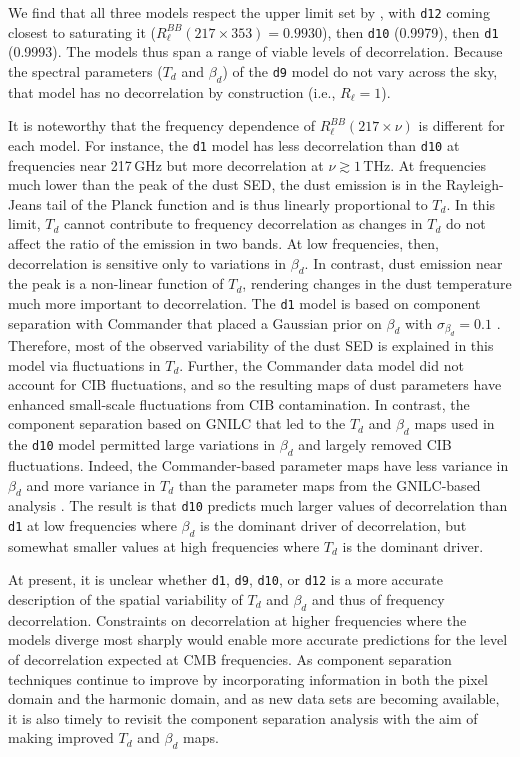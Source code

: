 \documentclass[twocolumn]{aastex631}
\begin{document}
We find that all three models respect the upper limit set by \citet{planck2016-l11A}, with \texttt{d12} coming closest to saturating it ($R_\ell^{BB}(217\times353) = 0.9930$), then \texttt{d10} (0.9979), then \texttt{d1} (0.9993). The models thus span a range of viable levels of decorrelation. Because the spectral parameters ($T_d$ and $\beta_d$) of the \texttt{d9} model do not vary across the sky, that model has no decorrelation by construction (i.e., $R_\ell = 1$).

It is noteworthy that the frequency dependence of $R_\ell^{BB}(217\times\nu)$ is different for each model. For instance, the \texttt{d1} model has less decorrelation than \texttt{d10} at frequencies near 217\,GHz but more decorrelation at $\nu \gtrsim 1$\,THz. At frequencies much lower than the peak of the dust SED, the dust emission is in the Rayleigh-Jeans tail of the Planck function and is thus linearly proportional to $T_d$. In this limit, $T_d$ cannot contribute to frequency decorrelation as changes in $T_d$ do not affect the ratio of the emission in two bands. At low frequencies, then, decorrelation is sensitive only to variations in $\beta_d$. In contrast, dust emission near the peak is a non-linear function of $T_d$, rendering changes in the dust temperature much more important to decorrelation. The \texttt{d1} model is based on component separation with Commander that placed a Gaussian prior on $\beta_d$ with $\sigma_{\beta_d} = 0.1$ \citep{planck2014-a12}. Therefore, most of the observed variability of the dust SED is explained in this model via fluctuations in $T_d$. Further, the Commander data model did not account for CIB fluctuations, and so the resulting maps of dust parameters have enhanced small-scale fluctuations from CIB contamination. In contrast, the component separation based on GNILC that led to the $T_d$ and $\beta_d$ maps used in the \texttt{d10} model \citep{planck2016-XLVIII} permitted large variations in $\beta_d$ and largely removed CIB fluctuations. Indeed, the Commander-based parameter maps have less variance in $\beta_d$ and more variance in $T_d$ than the parameter maps from the GNILC-based analysis \citep[see][Table~1]{planck2016-XLVIII}. The result is that \texttt{d10} predicts much larger values of decorrelation than \texttt{d1} at low frequencies where $\beta_d$ is the dominant driver of decorrelation, but somewhat smaller values at high frequencies where $T_d$ is the dominant driver.

At present, it is unclear whether \texttt{d1}, \texttt{d9}, \texttt{d10}, or \texttt{d12} is a more accurate description of the spatial variability of $T_d$ and $\beta_d$ and thus of frequency decorrelation. Constraints on decorrelation at higher frequencies where the models diverge most sharply would enable more accurate predictions for the level of decorrelation expected at CMB frequencies. As component separation techniques continue to improve by incorporating information in both the pixel domain and the harmonic domain, and as new data sets are becoming available, it is also timely to revisit the component separation analysis with the aim of making improved $T_d$ and $\beta_d$ maps.
\end{document}
